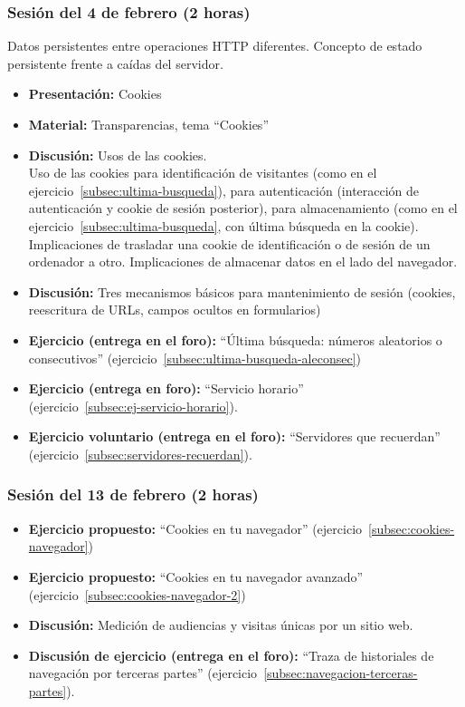 \documentclass[a4paper,12pt]{article}
\begin{document}
\subsubsection{Sesión del 4 de febrero (2 horas)}

Datos persistentes entre operaciones HTTP diferentes. Concepto de estado persistente frente a caídas del servidor.

\begin{itemize}
\item \textbf{Presentación:} Cookies
\item \textbf{Material:} Transparencias, tema ``Cookies''
\item \textbf{Discusión:} Usos de las cookies. \\
  Uso de las cookies para identificación de visitantes (como en el ejercicio~\ref{subsec:ultima-busqueda}), para autenticación (interacción de autenticación y cookie de sesión posterior), para almacenamiento (como en el ejercicio~\ref{subsec:ultima-busqueda}, con última búsqueda en la cookie). Implicaciones de trasladar una cookie de identificación o de sesión de un ordenador a otro. Implicaciones de almacenar datos en el lado del navegador.
\item \textbf{Discusión:} Tres mecanismos básicos para mantenimiento de sesión (cookies, reescritura de URLs, campos ocultos en formularios)
\item \textbf{Ejercicio (entrega en el foro):} ``Última búsqueda: números aleatorios o consecutivos'' (ejercicio~\ref{subsec:ultima-busqueda-aleconsec})
\item \textbf{Ejercicio (entrega en foro):} ``Servicio horario'' \\
  (ejercicio~\ref{subsec:ej-servicio-horario}).
\item \textbf{Ejercicio voluntario (entrega en el foro):} ``Servidores que recuerdan''  (ejercicio~\ref{subsec:servidores-recuerdan}).
\end{itemize}

\subsubsection{Sesión del 13 de febrero (2 horas)}

\begin{itemize}
\item \textbf{Ejercicio propuesto:} ``Cookies en tu navegador'' (ejercicio~\ref{subsec:cookies-navegador}) \\
\item \textbf{Ejercicio propuesto:} ``Cookies en tu navegador avanzado'' (ejercicio~\ref{subsec:cookies-navegador-2}) \\
\item \textbf{Discusión:} Medición de audiencias y visitas únicas por un sitio web.
\item \textbf{Discusión de ejercicio (entrega en el foro):} ``Traza de historiales de navegación por terceras partes'' (ejercicio~\ref{subsec:navegacion-terceras-partes}).
\end{itemize}
\end{document}
